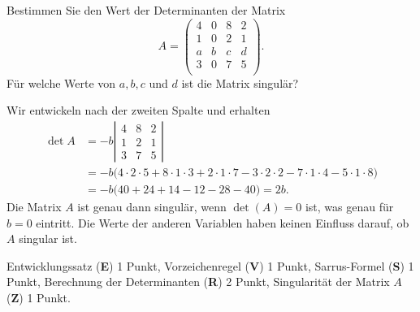 Bestimmen Sie den Wert der Determinanten der Matrix
\[
A=\begin{pmatrix}
   4&  0&   8&   2\\
   1&  0&   2&   1\\
   a&  b&   c&   d\\
   3&  0&   7&   5\\
\end{pmatrix}.
\]
Für welche Werte von $a,b,c$ und $d$ ist die Matrix singulär?

\begin{loesung}
Wir entwickeln nach der zweiten Spalte und erhalten
\begin{align*}
\det A
&=
-b\left|\begin{matrix}
   4&  8&  2\\
   1&  2&  1\\
   3&  7&  5
\end{matrix}\right|
\\
&=
-b\bigl(
4\cdot 2\cdot 5
+
8\cdot 1\cdot 3
+
2\cdot 1\cdot 7
-
3\cdot 2\cdot 2
-
7\cdot 1\cdot 4
-
5\cdot 1\cdot 8
\bigr)
\\
&=
-b\bigl(
40+24+14
-12-28-40
\bigr)
=
2b.
\end{align*}
Die Matrix $A$ ist genau dann singulär, wenn $\det(A)=0$ ist, was genau 
für $b=0$ eintritt.
Die Werte der anderen Variablen haben keinen Einfluss darauf, ob $A$
singular ist.
\end{loesung}

\begin{bewertung}
Entwicklungssatz ({\bf E}) 1 Punkt,
Vorzeichenregel ({\bf V}) 1 Punkt,
Sarrus-Formel ({\bf S}) 1 Punkt,
Berechnung der Determinanten ({\bf R}) 2 Punkt,
Singularität der Matrix $A$ ({\bf Z}) 1 Punkt.
\end{bewertung}


